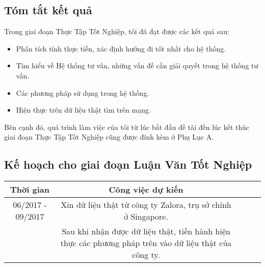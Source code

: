 \documentclass[a4paper,12pt,numbered,print,index,custombib, oneside, custommargin]{report}
\begin{document}
\subsection{Tóm tắt kết quả}
Trong giai đoạn Thực Tập Tốt Nghiệp, tôi đã đạt được các kết quả sau:
\begin{itemize}
\item Phân tích tính thực tiễn, xác định hướng đi tốt nhất cho hệ thống.
\item Tìm hiểu về Hệ thống tư vấn, những vấn đề cần giải quyết trong hệ thống tư vấn.
\item Các phương pháp sử dụng trong hệ thống.
\item Hiện thực trên dữ liệu thật tìm trên mạng.
\end{itemize} \par
Bên cạnh đó, quá trình làm việc của tôi từ lúc bắt đầu đề tài đến lúc kết thúc giai đoạn Thực Tập Tốt Nghiệp cũng được đính kèm ở Phụ Lục A. \par

\subsection{Kế hoạch cho giai đoạn Luận Văn Tốt Nghiệp}
\begin{center}
\begin{tabular} { |c|c|c|c|c| } 
\hline
Thời gian & Công việc dự kiến \\
\hline
06/2017 - 09/2017 & Xin dữ liệu thật từ công ty Zalora, trụ sở chính ở Singapore. \\
& Sau khi nhận được dữ liệu thật, tiến hành hiện thực các phương pháp trên vào dữ liệu thật của công ty. \\
%
\end{tabular}
\end{center}






%
%


\newpage


\end{document}
